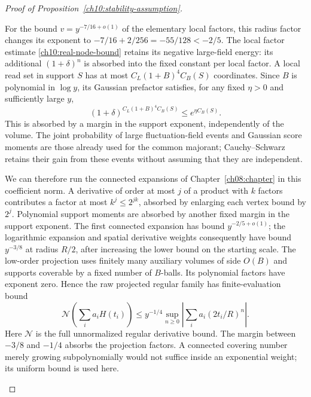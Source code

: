 \begin{proof}[Proof of Proposition~\ref{ch10:stability-assumption}]
\begin{enumerate}[label=\emph{Step \arabic*.},ref=\arabic*,leftmargin=*,align=left]
For the bound $v=y^{-7/16+o(1)}$ of the elementary local factors, this radius factor
changes its exponent to
$-7/16+2/256=-55/128<-2/5$.
The local factor estimate \eqref{ch10:real-node-bound} retains its negative
large-field energy: its additional $(1+\delta)^n$ is absorbed into
the fixed constant per local factor. A local read set in support $S$ has
at most $C_L(1+B)^4 C_B(S)$ coordinates. Since $B$ is polynomial
in $\log y$, its Gaussian prefactor satisfies, for any fixed
$\eta>0$ and sufficiently large $y$,
\[
 (1+\delta)^{C_L(1+B)^4C_B(S)}\le e^{\eta C_B(S)}.
\]
This is absorbed by a margin in the support exponent, independently of the
volume. The joint probability of large fluctuation-field events and Gaussian score moments
are those already used for the common majorant; Cauchy--Schwarz
retains their gain from these events without assuming that they are independent.

We can therefore run the connected expansions of
Chapter~\ref{ch08:chapter} in this coefficient norm. A derivative
of order at most $j$ of a product with $k$ factors contributes a factor at most
$k^j\le2^{jk}$, absorbed by enlarging each vertex bound by $2^j$.
Polynomial support moments are absorbed by another fixed margin in the
support exponent. The first connected expansion has bound $y^{-2/5+o(1)}$;
the logarithmic expansion and spatial derivative weights consequently
have bound $y^{-3/8}$ at radius $R/2$, after increasing the lower bound on the starting scale. The low-order projection uses finitely many auxiliary
volumes of side $O(B)$ and supports coverable by a fixed number of
$B$-balls. Its polynomial factors have exponent zero. Hence the
raw projected regular family has finite-evaluation bound
\begin{equation}\label{ch10:broad-test}
 \mathcal N\left(\sum_i a_i H(t_i)\right)
 \le y^{-1/4}\sup_{n\ge0}\left|\sum_i a_i(2t_i/R)^n\right|.
\end{equation}
Here $\mathcal N$ is the full unnormalized regular derivative bound.
The margin between $-3/8$ and $-1/4$ absorbs the projection factors.
A connected covering number merely growing subpolynomially would not suffice
inside an exponential weight; its uniform bound is used here.


\end{enumerate}
\end{proof}
